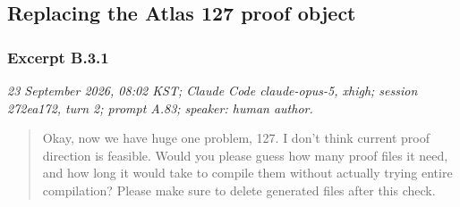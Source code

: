 \subsection{Replacing the Atlas 127 proof object}
\subsubsection*{Excerpt B.3.1}
\label{ex:B31}
\noindent\textit{23 September 2026, 08:02 KST; Claude Code claude-opus-5, xhigh; session 272ea172, turn 2; prompt A.83; speaker: human author.}
\begin{quote}\small\ttfamily\raggedright
Okay, now we have huge one problem, 127. I don't think current proof direction is feasible. Would you please guess how many proof files it need, and how long it would take to compile them without actually trying entire compilation? Please make sure to delete generated files after this check.
\par
\end{quote}

